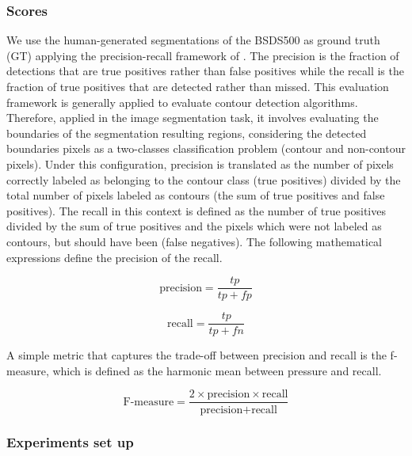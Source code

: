\subsubsection{Scores}
We use the human-generated segmentations of the BSDS500 as ground truth (GT) applying the precision-recall framework of \cite{Martin.Fowlkes.ea:PAMI:2004}. The precision is the fraction of detections that are true positives rather than false positives while the recall is the fraction of true positives that are detected rather than missed. This evaluation framework is generally applied to evaluate contour detection algorithms. Therefore, applied in the image segmentation task, it involves evaluating the boundaries of the segmentation resulting regions, considering the detected boundaries pixels as a two-classes classification problem (contour and non-contour pixels). Under this configuration, precision is translated as the number of pixels correctly labeled as belonging to the contour class (true positives) divided by the total number of pixels labeled as contours (the sum of true positives and false positives). The recall in this context is defined as the number of true positives divided by the sum of true positives and the pixels which were not labeled as contours, but should have been (false negatives). The following mathematical expressions define the precision of the recall. 

\begin{equation}\label{eq:precision_score}
    \text{precision} = \frac{tp}{tp+fp}
\end{equation}

\begin{equation}\label{eq:recall_score}
    \text{recall} = \frac{tp}{tp+fn}
\end{equation}

A simple metric that captures the trade-off between precision and recall is the f-measure, which is defined as the harmonic mean between pressure and recall.

\begin{equation}\label{eq:f_score}
    \text{F-measure} = \frac{2 \times \text{precision}\times\text{recall}}{\text{precision} + \text{recall}}
\end{equation}


\subsubsection{Experiments set up}

